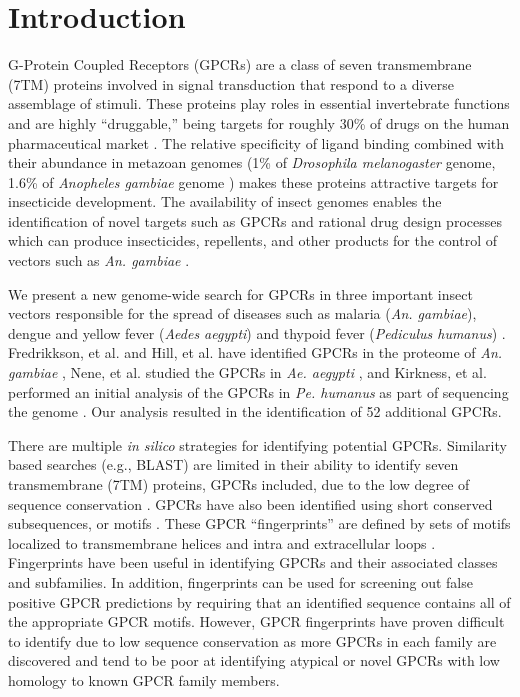 \section{Introduction}

G-Protein Coupled Receptors (GPCRs) are a class of seven transmembrane (7TM) proteins involved in signal transduction \cite{Pierce2002, Broeck2001} that respond to a diverse assemblage of stimuli.  These proteins play roles in essential invertebrate functions and are highly ``druggable,'' being targets for roughly 30\% of drugs on the human pharmaceutical market \cite{Wise2002}. The relative specificity of ligand binding combined with their abundance in metazoan genomes (1\% of \emph{Drosophila melanogaster} genome, 1.6\% of \emph{Anopheles gambiae} genome \cite{Adams2000, Hill2002}) makes these proteins attractive targets for insecticide development. The availability of insect genomes enables the identification of novel targets such as GPCRs and rational drug design processes which can produce insecticides, repellents, and other products for the control of vectors such as \emph{An. gambiae} \cite{Grimmelikhuijzen2007, Justice2003}.

We present a new genome-wide search for GPCRs in three important insect vectors responsible for the spread of diseases such as malaria (\emph{An. gambiae}), dengue and yellow fever (\emph{Aedes aegypti}) and thypoid fever (\emph{Pediculus humanus}) \cite{Fournier2002, Foucault2006, Grimmelikhuijzen2007}. Fredrikkson, et al. and Hill, et al. have identified GPCRs in the proteome of \emph{An. gambiae} \cite{Fredriksson2005, Hill2002}, Nene, et al. studied the GPCRs in \emph{Ae. aegypti} \cite{Nene2007}, and Kirkness, et al. performed an initial analysis of the GPCRs in \emph{Pe. humanus} as part of sequencing the genome \cite{Kirkness2010}.  Our analysis resulted in the identification of 52 additional GPCRs.

There are multiple \textit{in silico} strategies for identifying potential GPCRs. Similarity based searches (e.g., BLAST) are limited in their ability to identify seven transmembrane (7TM) proteins, GPCRs included, due to the low degree of sequence conservation \cite{Pierce2002, Davies2007}. GPCRs have also been identified using short conserved subsequences, or motifs \cite{Davies2007}. These GPCR ``fingerprints'' are defined by sets of motifs localized to transmembrane helices and intra and extracellular loops \cite{Attwood2001,Flower2004,Huang2003}. Fingerprints have been useful in identifying GPCRs and their associated classes and subfamilies. In addition, fingerprints can be used for screening out false positive GPCR predictions by requiring that an identified sequence contains all of the appropriate GPCR motifs.  However, GPCR fingerprints have proven difficult to identify due to low sequence conservation as more GPCRs in each family are discovered and tend to be poor at identifying atypical or novel GPCRs with low homology to known GPCR family members.

